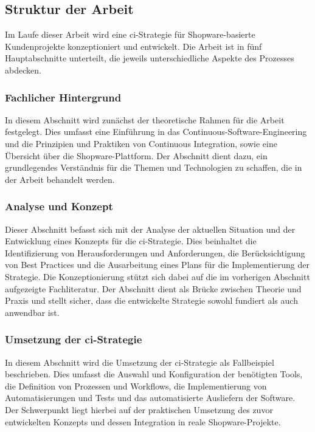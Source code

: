 \subsection{Struktur der Arbeit} \label{subsec:01-introduction-3}

Im Laufe dieser Arbeit wird eine \acrshort{ci}-Strategie für Shopware-basierte Kundenprojekte konzeptioniert und
entwickelt.
Die Arbeit ist in fünf Hauptabschnitte unterteilt, die jeweils unterschiedliche Aspekte des Prozesses abdecken.

\subsubsection{Fachlicher Hintergrund}

In diesem Abschnitt wird zunächst der theoretische Rahmen für die Arbeit festgelegt.
Dies umfasst eine Einführung in das Continuous-Software-Engineering und die Prinzipien und Praktiken von
Continuous Integration, sowie eine Übersicht über die Shopware-Plattform.
Der Abschnitt dient dazu, ein grundlegendes Verständnis für die Themen und Technologien zu schaffen, die in
der Arbeit behandelt werden.

\subsubsection{Analyse und Konzept}

Dieser Abschnitt befasst sich mit der Analyse der aktuellen Situation und der Entwicklung eines Konzepts für die
\acrshort{ci}-Strategie.
Dies beinhaltet die Identifizierung von Herausforderungen und Anforderungen, die Berücksichtigung von Best
Practices und die Ausarbeitung eines Plans für die Implementierung der Strategie.
Die Konzeptionierung stützt sich dabei auf die im vorherigen Abschnitt aufgezeigte Fachliteratur.
Der Abschnitt dient als Brücke zwischen Theorie und Praxis und stellt sicher, dass die entwickelte Strategie sowohl
fundiert als auch anwendbar ist.

\subsubsection{Umsetzung der \acrshort{ci}-Strategie}

In diesem Abschnitt wird die Umsetzung der \acrshort{ci}-Strategie als Fallbeispiel beschrieben.
Dies umfasst die Auswahl und Konfiguration der benötigten Tools, die Definition von Prozessen und Workflows,
die Implementierung von Automatisierungen und Tests und das automatisierte Ausliefern der Software.
Der Schwerpunkt liegt hierbei auf der praktischen Umsetzung des zuvor entwickelten Konzepts und dessen Integration in
reale Shopware-Projekte.


